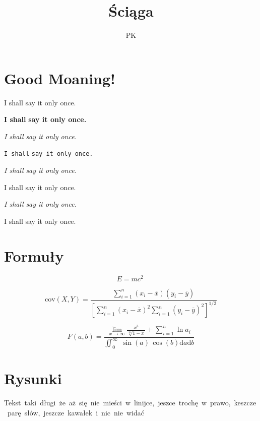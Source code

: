 \documentclass{article}
\title{Ściąga}
\author{PK}
\begin{document}
    \maketitle

\section{Good Moaning!}

    {\rm I shall} \textrm{say it only once.}

    {\bf I shall} \textbf{say it only once.}

    {\it I shall} \textit{say it only once.}

    {\tt I shall} \texttt{say it only once.}

    {\sl I shall} \textsl{say it only once.}

    {\sf I shall} \textsf{say it only once.}
    
    {\em I shall} \emph{ say it only once.}

    \textnormal{I shall say it only once.}

\section{Formuły}

    \begin{equation}
        E = mc^2 \;
        \label{eqn:clever}
    \end{equation}

    \begin{equation}
        \text{cov} (X,Y) = 
        \frac{\sum_{i=1}^n (x_i - \overline{x})(y_i - \overline{y})}
        {[\sum_{i=1}^n (x_i - \overline{x})^2 \sum_{i=1}^n (y_i - \overline{y})^2]^{1/2}}
    \end{equation}

    \begin{equation}
        F(a,b) = 
        \frac{\lim_{x \rightarrow \infty} \frac{x^3}{\sqrt[15]{1 - x} } + \sum_{i=1}^n \ln a_i}
        {\iint_0^{\infty} \; \sin (a) \, \cos (b) \mathrm{d}a \mathrm{d}b}
    \end{equation}

\section{Rysunki}

    \mbox{Tekst taki długi że aż się nie mieści w linijce, jeszce trochę w prawo, keszcze parę słów, jeszcze kawałek i nic nie widać}
\end{document}
